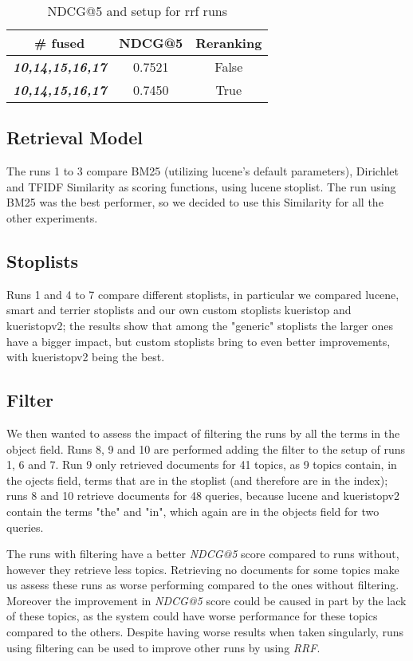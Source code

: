\begin{table}[t]
	\caption{NDCG@5 and setup for rrf runs}
	\label{tab:results-rrf-table}
	\centering
	\begin{tabular}{|c|c|c|}
		\toprule
		\# fused & NDCG@5 & Reranking \\
		\midrule
		\textit{\textbf{10,14,15,16,17}} & 0.7521 & False \\
		\textit{\textbf{10,14,15,16,17}} & 0.7450 & True \\
		\bottomrule
	\end{tabular}
\end{table}

\subsection{Retrieval Model}
The runs 1 to 3 compare BM25 (utilizing lucene's default parameters), Dirichlet and TFIDF Similarity as scoring functions, using lucene stoplist.
The run using BM25 was the best performer, so we decided to use this Similarity for all the other experiments.

\subsection{Stoplists}
Runs 1 and 4 to 7 compare different stoplists, in particular we compared lucene, smart and terrier stoplists and our own custom stoplists kueristop and kueristopv2; the results show that among the "generic" stoplists the larger ones have a bigger impact, but custom stoplists bring to even better improvements, with kueristopv2 being the best.

\subsection{Filter}
We then wanted to assess the impact of filtering the runs by all the terms in the object field.
Runs 8, 9 and 10 are performed adding the filter to the setup of runs 1, 6 and 7.
Run 9 only retrieved documents for 41 topics, as 9 topics contain, in the ojects field, terms that are in the stoplist (and therefore are in the index); runs 8 and 10 retrieve documents for 48 queries, because lucene and kueristopv2 contain the terms "the" and "in", which again are in the objects field for two queries.

The runs with filtering have a better \textit{NDCG@5} score compared to runs without, however they retrieve less topics. Retrieving no documents for some topics make us assess these runs as worse performing compared to the ones without filtering. Moreover the improvement in \textit{NDCG@5} score could be caused in part by the lack of these topics, as the system could have worse performance for these topics compared to the others.
Despite having worse results when taken singularly, runs using filtering can be used to improve other runs by using \textit{RRF}.

